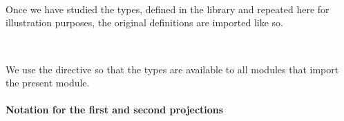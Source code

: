 \begin{code}
\>[1]\AgdaSpace{}%
\AgdaSymbol{:}\AgdaSpace{}%
\AgdaSymbol{(}\AgdaSpace{}%
\AgdaSymbol{:}\AgdaSpace{}%
\AgdaSpace{}%
\AgdaSpace{}%
\AgdaSymbol{)(}\AgdaSpace{}%
\AgdaSymbol{:}\AgdaSpace{}%
\AgdaSpace{}%
\AgdaSpace{}%
\AgdaSpace{}%
\AgdaSpace{}%
\AgdaSymbol{)}\AgdaSpace{}%
\AgdaSpace{}%
\AgdaSpace{}%
\AgdaSpace{}%
\AgdaSpace{}%
\<%
\\
%
\>[1]\AgdaSpace{}%
\AgdaSpace{}%
\AgdaSpace{}%
\AgdaSymbol{=}\AgdaSpace{}%
\AgdaSpace{}%
\<%
\\
%
\\[\AgdaEmptyExtraSkip]%
\>[1]\AgdaSpace{}%
\AgdaSpace{}%
\AgdaSpace{}%
\AgdaSpace{}%
\AgdaSpace{}%
\AgdaSpace{}%
\AgdaSymbol{)}\AgdaSpace{}%
\AgdaSymbol{=}\AgdaSpace{}%
\AgdaSpace{}%
\AgdaSpace{}%
\AgdaSpace{}%
\AgdaSpace{}%
\AgdaFunction{,}\AgdaSpace{}%
\<%
\end{code}
\ccpad
Once we have studied the types, defined in the \typetopology library and repeated here for illustration purposes, the original definitions are imported like so.
\ccpad
\begin{code}%
\>[0]\AgdaSpace{}%
\AgdaSpace{}%
\AgdaSpace{}\<%
\\
\>[0]\AgdaSpace{}%
\AgdaSpace{}%
\AgdaSpace{}%
\AgdaSpace{}%
\AgdaSymbol{(}\AgdaSymbol{;}\AgdaSpace{}%
\AgdaSymbol{;}\AgdaSpace{}%
\AgdaSymbol{;}\AgdaSpace{}%
\AgdaSymbol{;}\AgdaSpace{}%
\AgdaSymbol{;}\AgdaSpace{}%
\AgdaSymbol{)}\<%
\end{code}
\ccpad
We use the  directive so that the types are available to all modules that import the present module.

\paragraph{Notation for the first and second projections}

